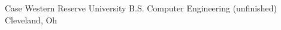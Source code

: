 
\begin{education}
	\school
	  {}	{Case Western Reserve University}
	  {}	{B.S. Computer Engineering \footnotesize{(unfinished)}}
	  			{Cleveland, Oh}

\end{education}
